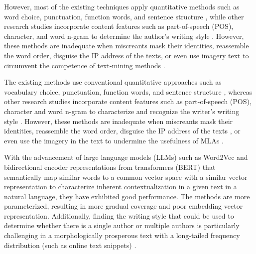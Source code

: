 \documentclass[conference]{IEEEtran}
\begin{document}
However, most of the existing techniques apply quantitative methods such as word choice, punctuation, function words, and sentence structure \cite{stamatatos2009survey,wu2021exploring}, while other research studies incorporate content features such as part-of-speech (POS), character, and word n-gram to determine the author's writing style \cite{zheng2023review,wu2021exploring}. However, these methods are inadequate when miscreants mask their identities, reassemble the word order, disguise the IP address of the texts, or even use imagery text to circumvent the competence of text-mining methods  \cite{alonso2021writer,modupe2022post}.

The existing methods use conventional quantitative approaches such as vocabulary choice, punctuation, function words, and sentence structure \cite{stamatatos2009survey,wu2021exploring}, whereas other research studies incorporate content features such as part-of-speech (POS), character and word n-gram to characterize and recognize the writer's writing style \cite{zheng2023review,wu2021exploring}. However, these methods are inadequate when miscreants mask their identities, reassemble the word order, disguise the IP address of the texts \cite{alonso2021writer}, or even use the imagery in the text to undermine the usefulness of MLAs \cite{modupe2011exploring,modupe2014filtering}.

With the advancement of large language models (LLMs) such as Word2Vec and bidirectional encoder representations from transformers (BERT) \cite{liu2020character,devlin2018bert} that semantically map similar words to a common vector space with a similar vector representation to characterize inherent contextualization in a given text in a natural language, they have exhibited good performance. The methods are more parameterized, resulting in more gradual coverage and poor embedding vector representation. Additionally, finding the writing style that could be used to determine whether there is a single author or multiple authors is particularly challenging in a morphologically prosperous text with a long-tailed frequency distribution (such as online text snippets) \cite{liu2020character}.
\end{document}
